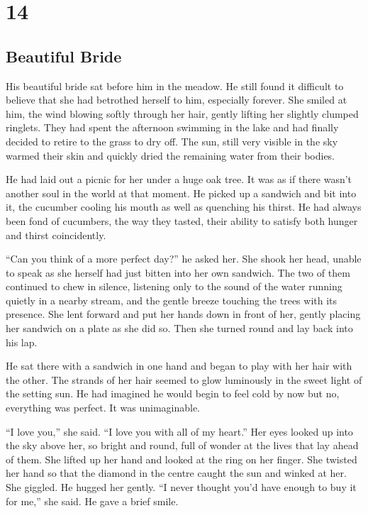 \chapter{14}
\section{Beautiful Bride}


His beautiful bride sat before him in the meadow.  He still found it difficult to believe that she had betrothed herself to him, especially forever.  She smiled at him, the wind blowing softly through her hair, gently lifting her slightly clumped ringlets.  They had spent the afternoon swimming in the lake and had finally decided to retire to the grass to dry off.  The sun, still very visible in the sky warmed their skin and quickly dried the remaining water from their bodies.  

He had laid out a picnic for her under a huge oak tree.  It was as if there wasn't another soul in the world at that moment.  He picked up a sandwich and bit into it, the cucumber cooling his mouth as well as quenching his thirst.  He had always been fond of cucumbers, the way they tasted, their ability to satisfy both hunger and thirst coincidently.

``Can you think of a more perfect day?'' he asked her.  She shook her head, unable to speak as she herself had just bitten into her own sandwich.  The two of them continued to chew in silence, listening only to the sound of the water running quietly in a nearby stream, and the gentle breeze touching the trees with its presence.  She lent forward and put her hands down in front of her, gently placing her sandwich on a plate as she did so.  Then she turned  round and lay back into his lap.

He sat there with a sandwich in one hand and began to play with her hair with the other.  The strands of her hair seemed to glow luminously in the sweet light of the setting sun.  He had imagined he would begin to feel cold by now but no, everything was perfect.  It was unimaginable.

``I love you,'' she said.  ``I love you with all of my heart.''  Her eyes looked up into the sky above her, so bright and round, full of wonder at the lives that lay ahead of them.  She lifted up her hand and looked at the ring on her finger.  She twisted her hand so that the diamond in the centre caught the sun and winked at her.  She giggled.  He hugged her gently.  ``I never thought you'd have enough to buy it for me,'' she said.  He gave a brief smile.

